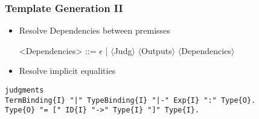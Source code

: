 \documentclass{beamer}
\begin{document}
\begin{frame}[fragile]
  \frametitle{Template Generation II}
\begin{itemize}
\item Resolve Dependencies between premisses
  \begin{grammar}
    <Dependencies> ::= $\epsilon$ | $\langle$Judg$\rangle$ $\langle$Outputs$\rangle$ $\langle$Dependencies$\rangle$
  \end{grammar}
\item Resolve implicit equalities
\end{itemize}

\begin{lstlisting}
judgments
TermBinding{I} "|" TypeBinding{I} "|-" Exp{I} ":" Type{O}.
Type{O} "= [" ID{I} "->" Type{I} "]" Type{I}.
\end{lstlisting}

\end{frame}

\renewcommand*\selectTemplateOptimization{orange}
\renewcommand*\selectTemplateOptimization{}
\end{document}
